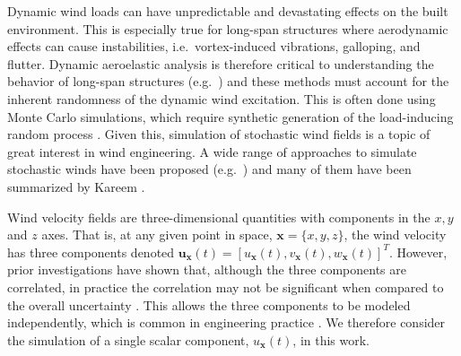 \documentclass[preprint, review, 12pt]{elsarticle}
\begin{document}
Dynamic wind loads can have unpredictable and devastating effects on the built environment. This is especially true for long-span structures where aerodynamic effects can cause instabilities, i.e.\ vortex-induced vibrations, galloping, and flutter.  Dynamic aeroelastic analysis is therefore critical to understanding the behavior of long-span structures (e.g.\ \citep{chen2000aerodynamic,Chen2010}) and these methods must account for the inherent randomness of the dynamic wind excitation. This is often done using Monte Carlo simulations, which require synthetic generation of the load-inducing random process \citep{Carassale2006}. Given this, simulation of stochastic wind fields is a topic of great interest in wind engineering. A wide range of approaches to simulate stochastic winds have been proposed (e.g.\ \cite{di1998digital,mann1998wind,cao2000simulation,li2004simplifying}) and many of them have been summarized by Kareem \cite{kareem2008numerical}.

Wind velocity fields are three-dimensional quantities with components in the $x, y$ and $z$ axes. That is, at any given point in space, $\mathbf{x}=\{x,y,z\}$, the wind velocity has three components denoted $\bm{u}_\mathbf{x}(t) = [u_\mathbf{x}(t), v_\mathbf{x}(t), w_\mathbf{x}(t)]^{T}$. However, prior investigations have shown that, although the three components are correlated, in practice the correlation may not be significant when compared to the overall uncertainty \cite{jones1992wind,minh1999numerical,oiseth2010simplified,Iseth2013}. This allows the three components to be modeled independently, which is common in engineering practice \cite{chen2000aerodynamic,strommen2010theory,tubino2007gust}. We therefore consider the simulation of a single scalar component, $u_\mathbf{x}(t)$, in this work.
\end{document}
